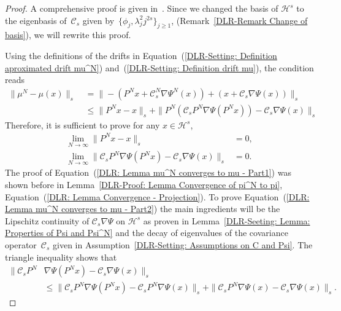 \begin{proof}
  A comprehensive proof is given in~\autocite{Pillai2012}. Since we changed the basis of $\mathcal{H}^s$ to the eigenbasis of~$\mathcal{C}_s$ given by~$\{ \phi_j, \lambda_j^2 j^{2s} \}_{j \geq 1}$, (Remark~\ref{DLR-Remark Change of basis}), we will rewrite this proof.
  
  Using the definitions of the drifts in Equation~(\ref{DLR-Setting: Definition aproximated drift mu^N}) and~(\ref{DLR-Setting: Definition drift mu}), the condition reads
  \begin{equation*}
    \begin{split}
      \| \mu^N - \mu(x) \|_s & \; = \| -  (P^Nx + \mathcal{C}_s^N \nabla \Psi^N(x)) + (x + \mathcal{C}_s \nabla \Psi(x))  \|_s \\
      & \; \leq \| P^N x - x \|_s + \| P^N ( \mathcal{C}_s P^N \nabla  \Psi(P^Nx) ) - \mathcal{C}_s \nabla \Psi(x) \|_s
    \end{split}
  \end{equation*}
  Therefore, it is sufficient to prove for any $x \in \mathcal{H}^s$,
  \begin{align}
    \label{DLR: Lemma mu^N converges to mu - Part1}
    \lim_{N \to \infty}  \| P^N x - x \|_s &  = 0, \\
    \label{DLR: Lemma mu^N converges to mu - Part2}
    \lim_{N \to \infty}  \|  \mathcal{C}_s P^N \nabla  \Psi(P^Nx)  - \mathcal{C}_s \nabla \Psi(x) \|_s & = 0.
  \end{align}
  The proof of Equation~(\ref{DLR: Lemma mu^N converges to mu - Part1}) was shown before in Lemma~\ref{DLR-Proof: Lemma Convergence of pi^N to pi}, Equation~(\ref{DLR: Lemma Convergence - Projection}). To prove Equation~(\ref{DLR: Lemma mu^N converges to mu - Part2}) the main ingredients will be the Lipschitz continuity of $\mathcal{C}_s \nabla \Psi$ on $\mathcal{H}^s$ as proven in Lemma~\ref{DLR-Seeting: Lemma: Properties of Psi and Psi^N} and the decay of eigenvalues of the covariance operator~$\mathcal{C}_s$ given in Assumption~\ref{DLR-Setting: Assumptions on C and Psi}. The triangle inequality shows that
  \begin{equation*}
    \begin{split}
     \|  \mathcal{C}_s P^N & \nabla  \Psi(P^Nx)  - \mathcal{C}_s \nabla \Psi(x) \|_s \\
     & \leq \|  \mathcal{C}_s P^N  \nabla  \Psi(P^Nx)  - \mathcal{C}_s P^N \nabla \Psi(x) \|_s + \|  \mathcal{C}_s P^N  \nabla  \Psi(x)  - \mathcal{C}_s \nabla \Psi(x) \|_s.
    \end{split}

\end{equation*}
\end{proof}
